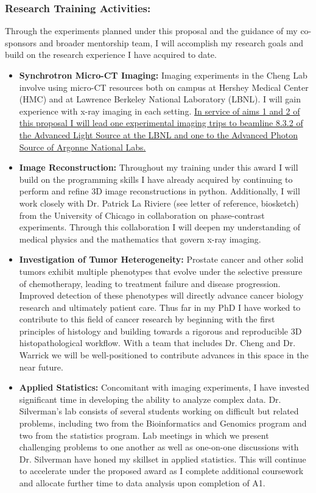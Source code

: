 \documentclass{NIHGrant}
\begin{document}
\subsubsection*{Research Training Activities:}
Through the experiments planned under this proposal and the guidance of my co-sponsors and broader mentorship team, I will accomplish my research goals and build on the research experience I have acquired to date.
\begin{itemize}[leftmargin=*, nosep]
  \item \textbf{Synchrotron Micro-CT Imaging:} Imaging experiments in the Cheng Lab involve using micro-CT resources both on campus at Hershey Medical Center (HMC) and at Lawrence Berkeley National Laboratory (LBNL). I will gain experience with x-ray imaging in each setting. \uline{In service of aims 1 and 2 of this proposal I will lead one experimental imaging trips to beamline 8.3.2 of the Advanced Light Source at the LBNL and one to the Advanced Photon Source of Argonne National Labs.}
  \item \textbf{Image Reconstruction:} Throughout my training under this award I will build on the programming skills I have already acquired by continuing to perform and refine 3D image reconstructions in python. Additionally, I will work closely with Dr. Patrick La Riviere (see letter of reference, biosketch) from the University of Chicago in collaboration on phase-contrast experiments. Through this collaboration I will deepen my understanding of medical physics and the mathematics that govern x-ray imaging.
  \item \textbf{Investigation of Tumor Heterogeneity:} Prostate cancer and other solid tumors exhibit multiple phenotypes that evolve under the selective pressure of chemotherapy, leading to treatment failure and disease progression. Improved detection of these phenotypes will directly advance cancer biology research and ultimately patient care. Thus far in my PhD I have worked to contribute to this field of cancer research by beginning with the first principles of histology and building towards a rigorous and reproducible 3D histopathological workflow. With a team that includes Dr. Cheng and Dr. Warrick we will be well-positioned to contribute advances in this space in the near future.%
  \item \textbf{Applied Statistics:} Concomitant with imaging experiments, I have invested significant time in developing the ability to analyze complex data. Dr. Silverman's lab consists of several students working on difficult but related problems, including two from the Bioinformatics and Genomics program and two from the statistics program. Lab meetings in which we present challenging problems to one another as well as one-on-one discussions with Dr. Silverman have honed my skillset in applied statistics. This will continue to accelerate under the proposed award as I complete additional coursework and allocate further time to data analysis upon completion of A1.

\end{itemize}
\end{document}
